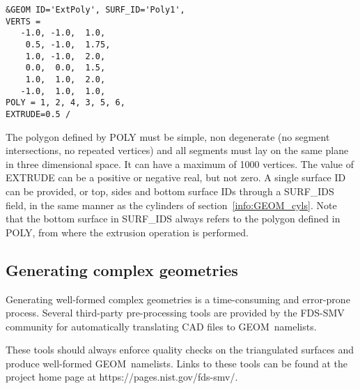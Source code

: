 \documentclass[12pt]{article}
\begin{document}
\begin{verbatim}
&GEOM ID='ExtPoly', SURF_ID='Poly1',
VERTS =
   -1.0, -1.0,  1.0,
    0.5, -1.0,  1.75,
    1.0, -1.0,  2.0,
    0.0,  0.0,  1.5,
    1.0,  1.0,  2.0,
   -1.0,  1.0,  1.0,
POLY = 1, 2, 4, 3, 5, 6, 
EXTRUDE=0.5 /
\end{verbatim}

The polygon defined by {\ct POLY} must be simple, non degenerate (no segment intersections, no repeated vertices) and all segments must lay on the same plane in three dimensional space. It can have a maximum of 1000 vertices. The value of {\ct EXTRUDE} can be a positive or negative real, but not zero. A single surface ID can be provided, or top, sides and bottom surface IDs through a  {\ct SURF\_IDS} field, in the same manner as the cylinders of section~\ref{info:GEOM_cyls}. Note that the bottom surface in {\ct SURF\_IDS} always refers to the polygon defined in {\ct POLY}, from where the extrusion operation is performed.


\subsection{Generating complex geometries}

Generating well-formed complex geometries is a time-consuming and error-prone process.
Several third-party pre-processing tools are provided by the FDS-SMV community for automatically translating CAD files to {\ct GEOM}\ namelists.

These tools should always enforce quality checks on the triangulated surfaces and produce well-formed {\ct GEOM}\ namelists.
Links to these tools can be found at the project home page at https://pages.nist.gov/fds-smv/.
\end{document}
